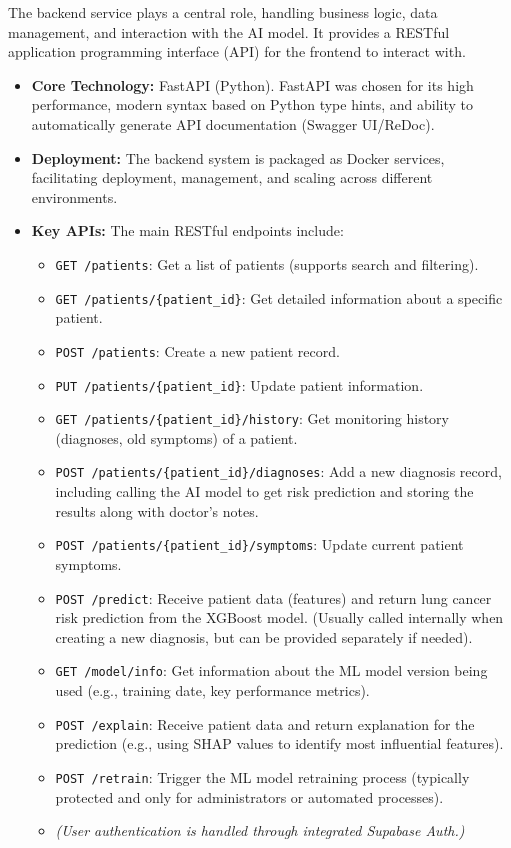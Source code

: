 The backend service plays a central role, handling business logic, data management, and interaction with the AI model. It provides a RESTful application programming interface (API) for the frontend to interact with.
\begin{itemize}
    \item \textbf{Core Technology:} FastAPI \cite{fastapi} (Python). FastAPI was chosen for its high performance, modern syntax based on Python type hints, and ability to automatically generate API documentation (Swagger UI/ReDoc).
    \item \textbf{Deployment:} The backend system is packaged as Docker \cite{docker} services, facilitating deployment, management, and scaling across different environments.
    \item \textbf{Key APIs:} The main RESTful endpoints include:
        \begin{itemize}
            \item \texttt{GET /patients}: Get a list of patients (supports search and filtering).
            \item \texttt{GET /patients/\{patient\_id\}}: Get detailed information about a specific patient.
            \item \texttt{POST /patients}: Create a new patient record.
            \item \texttt{PUT /patients/\{patient\_id\}}: Update patient information.
            \item \texttt{GET /patients/\{patient\_id\}/history}: Get monitoring history (diagnoses, old symptoms) of a patient.
            \item \texttt{POST /patients/\{patient\_id\}/diagnoses}: Add a new diagnosis record, including calling the AI model to get risk prediction and storing the results along with doctor's notes.
            \item \texttt{POST /patients/\{patient\_id\}/symptoms}: Update current patient symptoms.
            \item \texttt{POST /predict}: Receive patient data (features) and return lung cancer risk prediction from the XGBoost \cite{chen2016xgboost} model. (Usually called internally when creating a new diagnosis, but can be provided separately if needed).
            \item \texttt{GET /model/info}: Get information about the ML model version being used (e.g., training date, key performance metrics).
            \item \texttt{POST /explain}: Receive patient data and return explanation for the prediction (e.g., using SHAP values to identify most influential features).
            \item \texttt{POST /retrain}: Trigger the ML model retraining process (typically protected and only for administrators or automated processes).
            \item \textit{(User authentication is handled through integrated Supabase \cite{supabase} Auth.)}
        \end{itemize}
\end{itemize}

